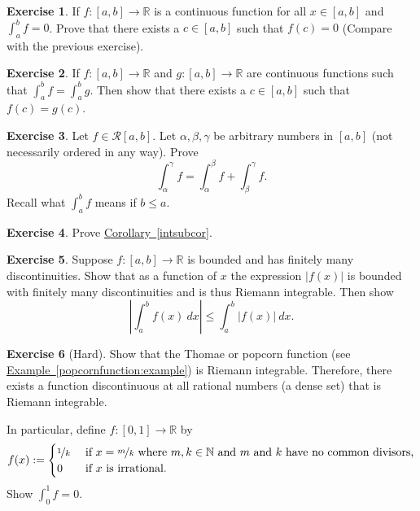 \documentclass[12pt]{book}
\newcommand{\abs}[1]{\left\lvert {#1} \right\rvert}
\newcommand{\R}{{\mathbb{R}}}
\newcommand{\N}{{\mathbb{N}}}
\newcommand{\sR}{{\mathcal{R}}}
\newcommand{\myindex}[1]{#1\index{#1}}
\theoremstyle{plain}
\theoremstyle{remark}
\theoremstyle{definition}
\theoremstyle{exercise}
\newtheorem{exercise}{Exercise}[section]
\theoremstyle{example}
\newcommand{\exampleref}[1]{\hyperref[#1]{Example~\ref*{#1}}}
\newcommand{\corref}[1]{\hyperref[#1]{Corollary~\ref*{#1}}}
\begin{document}
\begin{exercise}
If $f \colon [a,b] \to \R$ is a continuous function
for all $x \in [a,b]$ and $\int_a^b f = 0$.  Prove that
there exists a $c \in [a,b]$ such that $f(c) = 0$ (Compare with the
previous exercise).
\end{exercise}

\begin{exercise}
If $f \colon [a,b] \to \R$ and $g \colon [a,b] \to \R$
are continuous functions such that $\int_a^b f = \int_a^b g$.
Then show that there exists a $c \in [a,b]$ such that $f(c) = g(c)$.
\end{exercise}

\begin{exercise}
Let $f \in \sR[a,b]$.  Let $\alpha, \beta, \gamma$ be arbitrary numbers in
$[a,b]$ (not necessarily ordered in any way).  Prove 
\begin{equation*}
\int_\alpha^\gamma f =
\int_\alpha^\beta f +
\int_\beta^\gamma f .
\end{equation*}
Recall what $\int_a^b f$ means if $b \leq a$.
\end{exercise}

\begin{exercise}
Prove \corref{intsubcor}.
\end{exercise}

\begin{exercise} \label{exercise:easyabsint}
Suppose $f \colon [a,b] \to \R$ is bounded and
has finitely many discontinuities.
Show that as a function of $x$ the expression $\abs{f(x)}$ is bounded with finitely many
discontinuities and is thus Riemann integrable.  Then show 
\begin{equation*}
\abs{\int_a^b f(x)~dx} \leq \int_a^b \abs{f(x)}~dx .
\end{equation*}
\end{exercise}

\begin{exercise}[Hard]
Show that the
Thomae or \myindex{popcorn function}
(see \exampleref{popcornfunction:example})
is Riemann integrable.  Therefore, there exists a
function discontinuous at all rational numbers (a dense set)
that is Riemann integrable.

In particular,
define $f \colon [0,1] \to \R$ by
\begin{equation*}
f(x) := 
\begin{cases}
\nicefrac{1}{k} & \text{ if $x=\nicefrac{m}{k}$ where $m,k \in \N$
and $m$ and $k$ have no common divisors,} \\
0 & \text{ if $x$ is irrational}.
\end{cases}
\end{equation*}
Show $\int_0^1 f = 0$.
\end{exercise}
\end{document}
